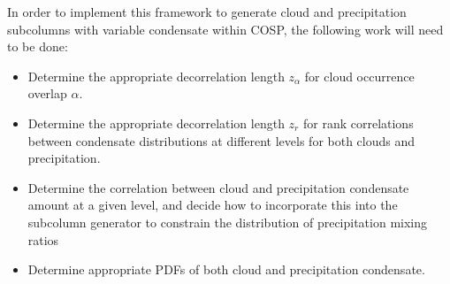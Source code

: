 \documentclass[letter]{article}
\begin{document}
In order to implement this framework to generate cloud and precipitation subcolumns with variable condensate within COSP, the following work will need to be done:
\begin{itemize}
    \item Determine the appropriate decorrelation length $z_{\alpha}$ for cloud occurrence overlap $\alpha$.
    \item Determine the appropriate decorrelation length $z_r$ for rank correlations between condensate distributions at different levels for both clouds and precipitation.
    \item Determine the correlation between cloud and precipitation condensate amount at a given level, and decide how to incorporate this into the subcolumn generator to constrain the distribution of precipitation mixing ratios
    \item Determine appropriate PDFs of both cloud and precipitation condensate.
\end{itemize}
\end{document}
